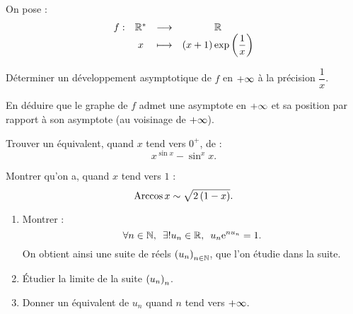 \begin{corr}
\end{corr}

\begin{exo}
On pose : \[\begin{array}[t]{cccc}f : & \mathbb{R}^* & \longrightarrow & \mathbb{R} \\ & x & \longmapsto & \left(x+1\right)\exp\left(\dfrac{1}{x}\right)\end{array}\]

Déterminer un développement asymptotique de \(f\) en \(+\infty\) à la précision \(\dfrac{1}{x}\).

En déduire que le graphe de \(f\) admet une asymptote en \(+\infty\) et sa position par rapport à son asymptote (au voisinage de \(+\infty\)).
\end{exo}

\begin{corr}
\end{corr}

\begin{exo}
Trouver un équivalent, quand \(x\) tend vers \(0^+\), de : \[x^{\sin x}-\sin^xx.\]
\end{exo}

\begin{corr}
\end{corr}

\begin{exo}
Montrer qu'on a, quand \(x\) tend vers \(1\) : \[\operatorname{Arccos} x\sim\sqrt{2\left(1-x\right)}.\]
\end{exo}

\begin{corr}
\end{corr}

\begin{exo}
\begin{enumerate}
\item Montrer : \[\quantifs{\forall n\in\N;\exists!u_n\in\R}u_n\e{nu_n}=1.\] On obtient ainsi une suite de réels \(\left(u_n\right)_{n\in\mathbb{N}}\), que l'on étudie dans la suite. \\

\item Étudier la limite de la suite \(\left(u_n\right)_n\). \\

\item Donner un équivalent de \(u_n\) quand \(n\) tend vers \(+\infty\).
\end{enumerate}
\end{exo}

\begin{corr}
\end{corr}

